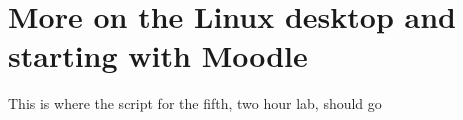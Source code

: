 \chapter{More on the Linux desktop and starting with Moodle}

\begin{note}
  This is where the script for the fifth, two hour lab, should go
\end{note}

